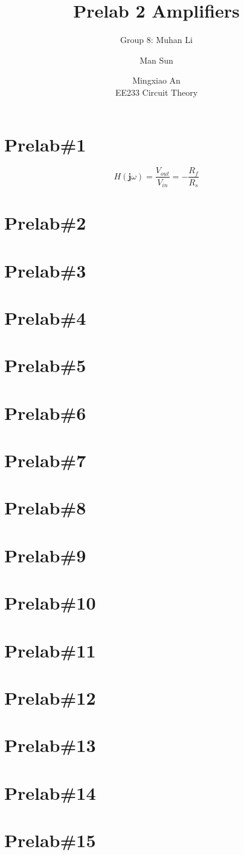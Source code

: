 \documentclass{IEEEtran}
\title{Prelab 2 Amplifiers}
\author{Group 8: Muhan Li \and Man Sun \and Mingxiao An \\ EE233 Circuit Theory}
\begin{document}
	\maketitle
	\section{\textbf{Prelab\#1}}
	\begin{equation*}
		H(\mathbf{j}\omega) = \frac{V_{out}}{V_{in}} = -\frac{R_f}{R_s}
	\end{equation*}
	\section{\textbf{Prelab\#2}}
	\section{\textbf{Prelab\#3}}
	\section{\textbf{Prelab\#4}}
	\section{\textbf{Prelab\#5}}
	\section{\textbf{Prelab\#6}}
	\section{\textbf{Prelab\#7}}
	\section{\textbf{Prelab\#8}}
	\section{\textbf{Prelab\#9}}
	\section{\textbf{Prelab\#10}}
	\section{\textbf{Prelab\#11}}
	\section{\textbf{Prelab\#12}}
	\section{\textbf{Prelab\#13}}
	\section{\textbf{Prelab\#14}}
	\section{\textbf{Prelab\#15}}
\end{document}
